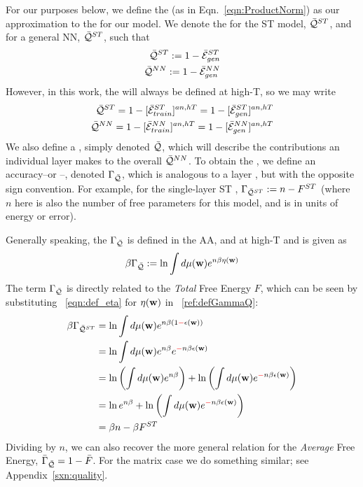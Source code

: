 {For our purposes below, we define the \ModelQuality (as in Eqn.~\ref{eqn:ProductNorm}) as our approximation to the
\AverageGeneralizationAccuracy for our model. 
We denote the \ModelQuality for the ST \Perceptron model, $\bar{\mathcal{Q}}^{ST}$,
and for a general NN, $\bar{\mathcal{Q}}^{ST}$, such that
\begin{align}
  \label{eqn:model_pre_qualities}
\bar{\mathcal{Q}}^{ST}:=1-\bar{\mathcal{E}}_{gen}^{ST}  \\ 
\bar{\mathcal{Q}}^{NN}:=1-\bar{\mathcal{E}}_{gen}^{NN}  
\end{align}
However, in this work, the \Quality will always be defined at high-T, so we may write
\begin{align}
  \label{eqn:model_qualities}
  \bar{\mathcal{Q}}^{ST}=1-[\bar{\mathcal{E}}_{train}^{ST}]^{an,hT}=1-[\bar{\mathcal{E}}_{gen}^{ST}]^{an,hT} \\
  \bar{\mathcal{Q}}^{NN}=1-[\bar{\mathcal{E}}_{train}^{NN}]^{an,hT}=1-[\bar{\mathcal{E}}_{gen}^{NN}]^{an,hT} 
\end{align}
We also define a \LayerQuality, simply denoted $\bar{\mathcal{Q}}$,
which will describe the contributions an individual layer makes to the overall \ModelQuality $\bar{\mathcal{Q}}^{NN}$.
To obtain the \LayerQuality, we define an accuracy--or \Quality--\GeneratingFunction, denoted $\Gamma_{\bar{\mathcal{Q}}}$, which
is analogous to a layer \FreeEnergy, but with the opposite sign convention.
For example, for the single-layer ST \Perceptron, $\Gamma_{\bar{\mathcal{Q}}^{ST}}:=n-F^{ST}$
(where $n$ here is also the number of free parameters for this model, and is in units of energy or error).

Generally speaking, the \Quality \GeneratingFunction $\Gamma_{\bar{\mathcal{Q}}}$ is defined in the AA, and at high-T and is given as
\begin{align}
  \label{ref:defGammaQ}
  \beta\Gamma_{\bar{\mathcal{Q}}} := \ln\int d\mu({\mathbf{w}}) e^{n\beta\eta({\mathbf{w}})}
\end{align}
The term $\Gamma_{\bar{\mathcal{Q}}}$ is directly related to the \emph{Total} Free Energy $F$, which can be seen by substituting \EQN~\ref{eqn:def_eta}
for $\eta({\mathbf{w}})$ in \EQN~\ref{ref:defGammaQ}:
\begin{align}
  \label{ref:defGammaQtoF}
  \beta\Gamma_{\bar{\mathcal{Q}}^{ST}}
  &= \ln\int d\mu({\mathbf{w}}) e^{n\beta(1{\color{red}\sf{-}}\epsilon({\mathbf{w}}))} \\ \nonumber
    &= \ln\int d\mu({\mathbf{w}}) e^{n\beta}e^{{\color{red}\sf{-}}n\beta\epsilon({\mathbf{w}})} \\ \nonumber
    &= \ln\left(\int d\mu({\mathbf{w}}) e^{n\beta}\right)+\ln\left(\int d\mu({\mathbf{w}})e^{{\color{red}\sf{-}}n\beta\epsilon({\mathbf{w}})}\right) \\ \nonumber
   &= \ln e^{n\beta}+\ln\left(\int d\mu({\mathbf{w}})e^{{\color{red}\sf{-}}n\beta\epsilon({\mathbf{w}})}\right) \\ \nonumber
  &= \beta n-\beta F^{ST}
\end{align}
Dividing by $n$, we can also recover the more general relation for the \emph{Average} Free Energy,
$\bar{\Gamma}_{\bar{\mathcal{Q}}}=1-\bar{F}$. For the matrix case we do something similar; see Appendix~\ref{sxn:quality}.

}
